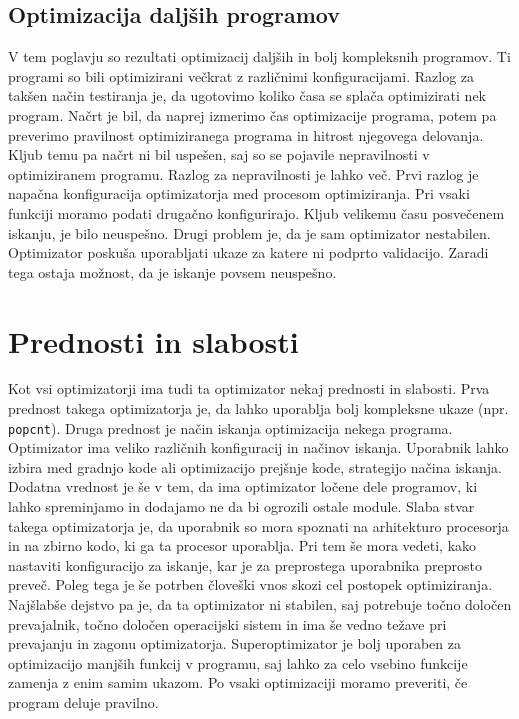 \documentclass[a4paper, 12pt]{book}
\begin{document}
\subsection{Optimizacija daljših programov}

V tem poglavju so rezultati optimizacij daljših in bolj kompleksnih programov. Ti programi so bili optimizirani večkrat z različnimi konfiguracijami. Razlog za takšen način testiranja je, da ugotovimo koliko časa se splača optimizirati nek program. Načrt je bil, da naprej izmerimo čas optimizacije programa, potem pa preverimo pravilnost optimiziranega programa in hitrost njegovega delovanja. Kljub temu pa načrt ni bil uspešen, saj so se pojavile nepravilnosti v optimiziranem programu. Razlog za nepravilnosti je lahko več. Prvi razlog je napačna konfiguracija optimizatorja med procesom optimiziranja. Pri vsaki funkciji moramo podati drugačno konfigurirajo. Kljub velikemu času posvečenem iskanju, je bilo neuspešno. Drugi problem je, da je sam optimizator nestabilen. Optimizator poskuša uporabljati ukaze za katere ni podprto validacijo. Zaradi tega ostaja možnost, da je iskanje povsem neuspešno. 

\section{Prednosti in slabosti}

Kot vsi optimizatorji ima tudi ta optimizator nekaj prednosti in slabosti. Prva prednost takega optimizatorja je, da lahko uporablja bolj kompleksne ukaze (npr. \texttt{popcnt}). Druga prednost je način iskanja optimizacija nekega programa. Optimizator ima veliko različnih konfiguracij in načinov iskanja. Uporabnik lahko izbira med gradnjo kode ali optimizacijo prejšnje kode, strategijo načina iskanja. Dodatna vrednost je še v tem, da ima optimizator ločene dele programov, ki lahko spreminjamo in dodajamo ne da bi ogrozili ostale module. Slaba stvar takega optimizatorja je, da uporabnik so mora spoznati na arhitekturo procesorja in na zbirno kodo, ki ga ta procesor uporablja. Pri tem še mora vedeti, kako nastaviti konfiguracijo za iskanje, kar je za preprostega uporabnika preprosto preveč. Poleg tega je še potrben človeški vnos skozi cel postopek optimiziranja. Najšlabše dejstvo pa je, da ta optimizator ni stabilen, saj potrebuje točno določen prevajalnik, točno določen operacijski sistem in ima še vedno težave pri prevajanju in zagonu optimizatorja. Superoptimizator je bolj uporaben za optimizacijo manjših funkcij v programu, saj lahko za celo vsebino funkcije zamenja z enim samim ukazom. Po vsaki optimizaciji moramo preveriti, če program deluje pravilno.
\end{document}
